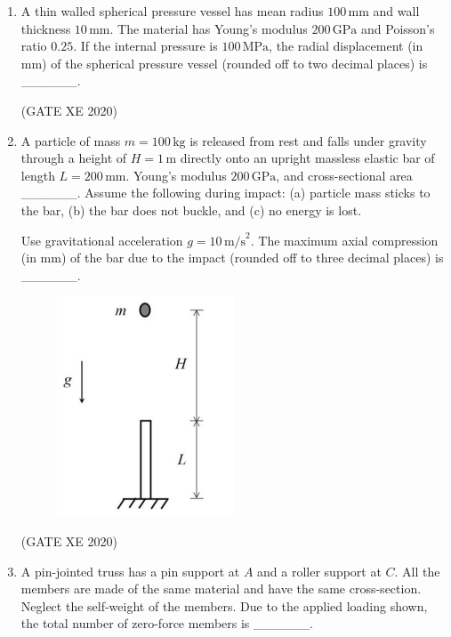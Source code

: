 \documentclass[12pt]{article}
\begin{document}
\begin{enumerate}
\item A thin walled spherical pressure vessel has mean radius $100 \,\text{mm}$ and wall thickness $10 \,\text{mm}$. The material has Young's modulus $200 \,\text{GPa}$ and Poisson’s ratio $0.25$. If the internal pressure is $100 \,\text{MPa}$, the radial displacement (in mm) of the spherical pressure vessel (rounded off to two decimal places) is \_\_\_\_\_\_.  

(GATE XE 2020)

\item A particle of mass $m = 100 \,\text{kg}$ is released from rest and falls under gravity through a height of $H = 1 \,\text{m}$ directly onto an upright massless elastic bar of length $L = 200 \,\text{mm}$. Young's modulus $200 \,\text{GPa}$, and cross-sectional area \_\_\_\_\_\_.  
Assume the following during impact:  
(a) particle mass sticks to the bar,  
(b) the bar does not buckle, and  
(c) no energy is lost.  

Use gravitational acceleration $g = 10 \,\text{m/s}^2$.  
The maximum axial compression (in mm) of the bar due to the impact (rounded off to three decimal places) is \_\_\_\_\_\_.  

\begin{figure}[H]
    \centering
    \includegraphics[width=0.5\columnwidth]{figs/ass4_d_q17.png}
    \caption{}
    \label{fig:placeholder}
\end{figure}

(GATE XE 2020)

\item A pin-jointed truss has a pin support at $A$ and a roller support at $C$. All the members are made of the same material and have the same cross-section. Neglect the self-weight of the members. Due to the applied loading shown, the total number of zero-force members is \_\_\_\_\_\_.  


\end{enumerate}
\end{document}
